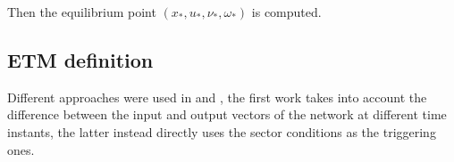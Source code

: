 \documentclass{article}
\begin{document}
Then the equilibrium point $\left( x_{*}, u_{*}, \nu_{*}, \omega_{*} \right)$ is computed.

\subsection*{ETM definition}
Different approaches were used in \cite{css-paper} and \cite{css-extended}, the first work takes into account the difference between the input and output vectors of the network at different time instants, the latter instead directly uses the sector conditions as the triggering ones.

\pagebreak
\printbibliography
\end{document}
